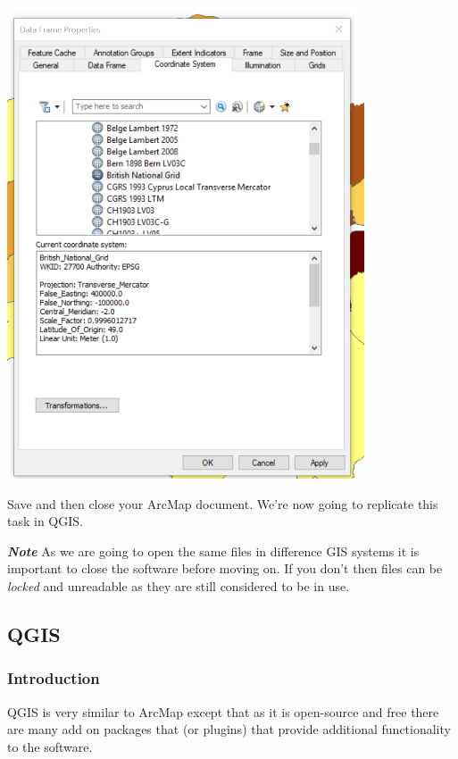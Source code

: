 \documentclass[]{book}
\begin{document}
\begin{center}\includegraphics[width=300pt]{prac1_images/coorindate_system} \end{center}

Save and then close your ArcMap document. We're now going to replicate this task in QGIS.

\textbf{\emph{Note}} As we are going to open the same files in difference GIS systems it is important to close the software before moving on. If you don't then files can be \emph{locked} and unreadable as they are still considered to be in use.

\hypertarget{qgis}{%
\subsection{QGIS}\label{qgis}}

\hypertarget{introduction-1}{%
\subsubsection{Introduction}\label{introduction-1}}

QGIS is very similar to ArcMap except that as it is open-source and free there are many add on packages that (or plugins) that provide additional functionality to the software.
\end{document}
